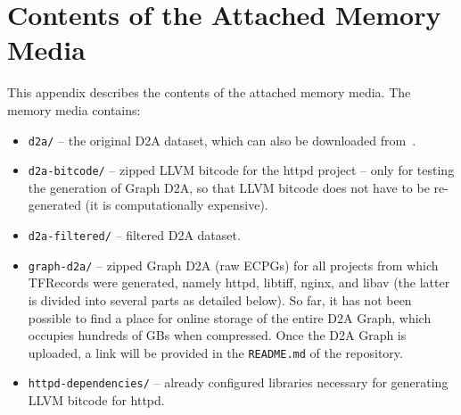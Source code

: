 \chapter{Contents of the Attached Memory Media}
\label{appendix-media}
This appendix describes the contents of the attached memory media. The memory media contains:
\begin{itemize}
    \item \texttt{d2a/} -- the original D2A dataset, which can also be downloaded from~\cite{D2A-webpage}.
    \item \texttt{d2a-bitcode/} -- zipped LLVM bitcode for the httpd project -- only for testing the generation of Graph D2A, so that LLVM bitcode does not have to be re-generated (it is computationally expensive).
    \item \texttt{d2a-filtered/} -- filtered D2A dataset.
    \item \texttt{graph-d2a/} -- zipped Graph D2A (raw ECPGs) for all projects from which TFRecords were generated, namely httpd, libtiff, nginx, and libav (the latter is divided into several parts as detailed below). So far, it has not been possible to find a place for online storage of the entire D2A Graph, which occupies hundreds of GBs when compressed. Once the D2A Graph is uploaded, a link will be provided in the \texttt{README.md} of the repository.
    \item \texttt{httpd-dependencies/} -- already configured libraries necessary for generating LLVM bitcode for httpd.
    

\end{itemize}
